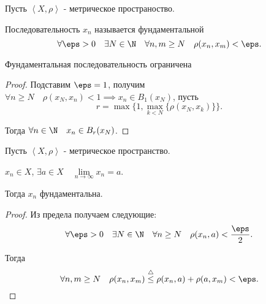 

\begin{definition} \thmslashn 

    Пусть $\left<X, \rho\right>$ - метрическое пространоство.

    Последовательность $x_{n}$ называется фундаментальной
    \[ \forall{\eps > 0}\quad \exists{N\in \N}\quad \forall{n, m \ge  N}\quad \rho(x_{n}, x_{m}) < \eps  .\] 
\end{definition}

\begin{lemma} \thmslashn

    Фундаментальная последовательность ограничена

    \begin{proof} \thmslashn
    
        Подставим $\eps = 1$, получим $\forall{n \ge N}\quad \rho(x_{N}, x_{n}) < 1 \implies x_{n}\in B_{1}(x_{N})$, пусть 
        \[ r = \max \{1, \max\limits_{k < N} \{\rho(x_{N}, x_{k})\} \} .\]

        Тогда $\forall{n\in \N}\quad x_{n}\in B_{r}(x_{N})$.
    \end{proof}
\end{lemma}

\begin{lemma} \thmslashn

    Пусть $\left<X, \rho\right>$ - метрическое пространство.

    $x_{n}\in X$, $\exists{a\in X}\quad \lim\limits_{n \to \infty} x_{n} = a$.

    Тогда $x_{n}$ фундаментальна.

    \begin{proof} \thmslashn
    
        Из предела получаем следующие:
        \[ \forall{\eps > 0}\quad \exists{N\in \N}\quad \forall{n \ge N}\quad \rho(x_{n}, a) < \frac{\eps}{2} .\]

        Тогда
        \[ \forall{n, m \ge N}\quad \rho(x_{n}, x_{m}) \overset{\triangle}{\le} \rho(x_{n}, a) + \rho(a, x_{m}) < \eps .\] 
    \end{proof}
\end{lemma}

